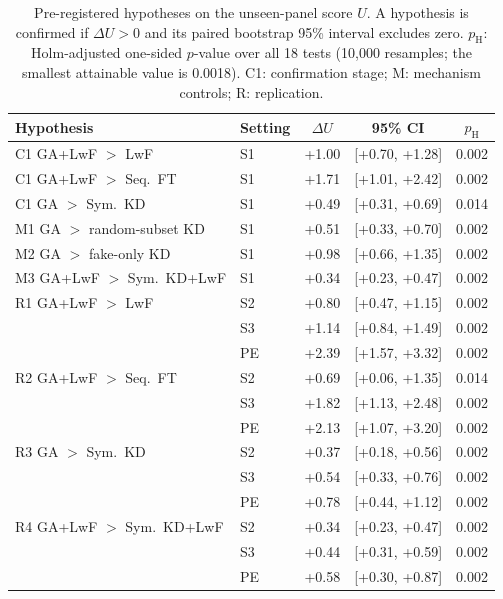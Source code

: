 \documentclass[journal]{IEEEtran}
\begin{document}
\begin{table}[t]
\caption{Pre-registered hypotheses on the unseen-panel score $U$. A hypothesis is confirmed if $\Delta U>0$ and its paired bootstrap 95\% interval excludes zero. $p_{\mathrm{H}}$: Holm-adjusted one-sided $p$-value over all 18 tests (10{,}000 resamples; the smallest attainable value is 0.0018). C1: confirmation stage; M: mechanism controls; R: replication.}
\label{tab:hyp}
\centering
\footnotesize
\setlength{\tabcolsep}{2.4pt}
\begin{tabular}{@{}llccc@{}}
\toprule
Hypothesis & Setting & $\Delta U$ & 95\% CI & $p_{\mathrm{H}}$ \\
\midrule
C1 GA+LwF $>$ LwF & S1 & +1.00 & [+0.70, +1.28] & 0.002 \\
C1 GA+LwF $>$ Seq.\ FT & S1 & +1.71 & [+1.01, +2.42] & 0.002 \\
C1 GA $>$ Sym.\ KD & S1 & +0.49 & [+0.31, +0.69] & 0.014 \\
\midrule
M1 GA $>$ random-subset KD & S1 & +0.51 & [+0.33, +0.70] & 0.002 \\
M2 GA $>$ fake-only KD & S1 & +0.98 & [+0.66, +1.35] & 0.002 \\
M3 GA+LwF $>$ Sym.\ KD+LwF & S1 & +0.34 & [+0.23, +0.47] & 0.002 \\
\midrule
R1 GA+LwF $>$ LwF & S2 & +0.80 & [+0.47, +1.15] & 0.002 \\
 & S3 & +1.14 & [+0.84, +1.49] & 0.002 \\
 & PE & +2.39 & [+1.57, +3.32] & 0.002 \\
R2 GA+LwF $>$ Seq.\ FT & S2 & +0.69 & [+0.06, +1.35] & 0.014 \\
 & S3 & +1.82 & [+1.13, +2.48] & 0.002 \\
 & PE & +2.13 & [+1.07, +3.20] & 0.002 \\
R3 GA $>$ Sym.\ KD & S2 & +0.37 & [+0.18, +0.56] & 0.002 \\
 & S3 & +0.54 & [+0.33, +0.76] & 0.002 \\
 & PE & +0.78 & [+0.44, +1.12] & 0.002 \\
R4 GA+LwF $>$ Sym.\ KD+LwF & S2 & +0.34 & [+0.23, +0.47] & 0.002 \\
 & S3 & +0.44 & [+0.31, +0.59] & 0.002 \\
 & PE & +0.58 & [+0.30, +0.87] & 0.002 \\
\bottomrule
\end{tabular}
\end{table}
\end{document}

